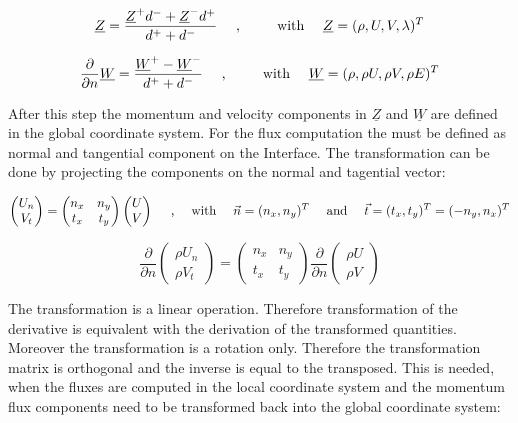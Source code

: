 \documentclass[
	pdftex,             %
	12pt,				%
	a4paper,		   	%
	english,				%
	oneside,			%
]{article}
\newcommand{\uu}[1]{\underline{#1}}
\newcommand{\vv}[1]{\vec{#1}}
\begin{document}
\begin{equation}
\uu{Z} = \dfrac{\uu{Z}^+ d^- + \uu{Z}^- d^+}{d^+ + d^-}
\textnormal{~~~~,~~~~~~~~with~~~~}
\uu{Z} = (\rho, U, V, \lambda)^T
\end{equation}

\begin{equation}
\dfrac{\partial}{\partial n} \uu{W} = \dfrac{\uu{W}^+ -\uu{W}^- }{d^+ + d^-}
\textnormal{~~~~,~~~~~~~~with~~~~}
\uu{W} = (\rho, \rho U, \rho V, \rho E)^T
\end{equation}

After this step the momentum and velocity components in $\uu{Z}$ and $\uu{W}$ are defined in the global coordinate system. For the flux computation the must be defined as normal and tangential component on the Interface. The transformation can be done by projecting the components on the normal and tagential vector:

\begin{equation}
\begin{pmatrix} U_n \\ V_t \end{pmatrix}
=
\begin{pmatrix} n_x & n_y \\ t_x & t_y \end{pmatrix}
\begin{pmatrix} U \\ V \end{pmatrix}
\textnormal{~~~~,~~~~with~~~~}
\vv{n} = (n_x, n_y)^T
\textnormal{~~~~and~~~~}
\vv{t} = (t_x, t_y)^T = (-n_y, n_x)^T
\end{equation}

\begin{equation}
\dfrac{\partial}{\partial n}
\begin{pmatrix} \rho U_n \\ \rho V_t \end{pmatrix}
=
\begin{pmatrix} n_x & n_y \\ t_x & t_y \end{pmatrix}
\dfrac{\partial}{\partial n}
\begin{pmatrix} \rho U \\ \rho V \end{pmatrix}
\end{equation}

The transformation is a linear operation. Therefore transformation of the derivative is equivalent with the derivation of the transformed quantities. Moreover the transformation is a rotation only. Therefore the transformation matrix is orthogonal and the inverse is equal to the transposed. This is needed, when the fluxes are computed in the local coordinate system and the momentum flux components need to be transformed back into the global coordinate system:
\end{document}

